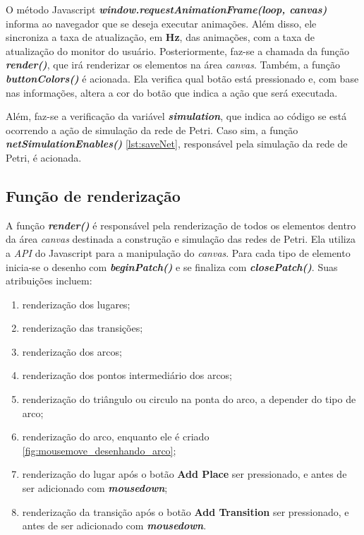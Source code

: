 \documentclass[
	12pt,				%
	openright,			%
	oneside,			%
	a4paper,			%
	english,			%
	brazil				%
	]{abntex2}
\begin{document}
O método Javascript \textbf{\textit{window.requestAnimationFrame(loop, canvas)}} informa ao navegador que se deseja executar animações. Além disso, ele sincroniza a taxa de atualização, em \textbf{Hz}, das animações, com a taxa de atualização do monitor do usuário. Posteriormente, faz-se a chamada da função \textbf{\textit{render()}}, que irá renderizar os elementos na área \textit{canvas}. Também, a função \textbf{\textit{buttonColors()}} é acionada. Ela verifica qual botão está pressionado e, com base nas informações, altera a cor do botão que indica a ação que será executada. 

Além, faz-se a verificação da variável \textbf{\textit{simulation}}, que indica ao código se está ocorrendo a ação de simulação da rede de Petri. Caso sim, a função \textbf{\textit{netSimulationEnables()}} \ref{lst:saveNet}, responsável pela simulação da rede de Petri, é acionada.

\subsection*{Função de renderização}

A função \textbf{\textit{render()}} é responsável pela renderização de todos os elementos dentro da área \textit{canvas} destinada a construção e simulação das redes de Petri. Ela utiliza a \textit{API} do Javascript para a manipulação do \textit{canvas}. Para cada tipo de elemento inicia-se o desenho com \textbf{\textit{beginPatch()}} e se finaliza com \textbf{\textit{closePatch()}}. Suas atribuições incluem:

\begin{enumerate}
	\item renderização dos lugares;
	\item renderização das transições;
	\item renderização dos arcos;
	\item renderização dos pontos intermediário dos arcos;
	\item renderização do triângulo ou circulo na ponta do arco, a depender do tipo de arco;
	\item renderização do arco, enquanto ele é criado \ref{fig:mousemove_desenhando_arco};
	\item renderização do lugar após o botão \textbf{Add Place} ser pressionado, e antes de ser adicionado com \textbf{\textit{mousedown}};
	\item renderização da transição após o botão \textbf{Add Transition} ser pressionado, e antes de ser adicionado com \textbf{\textit{mousedown}}.
\end{enumerate}
\end{document}
